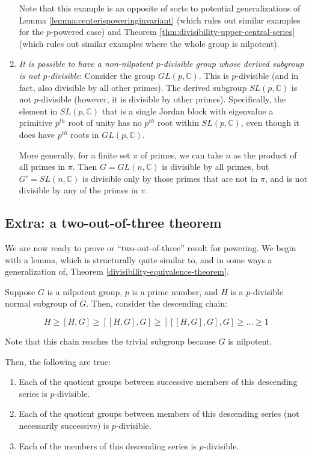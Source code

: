 \documentclass{ucetd}
\begin{document}
\begin{enumerate}
  Note that this example is an opposite of sorts to potential
  generalizations of Lemma \ref{lemma:centerispoweringinvariant} (which
  rules out similar examples for the $p$-powered case) and Theorem
  \ref{thm:divisibility-upper-central-series} (which rules out similar
  examples where the whole group is nilpotent).

\item {\em It is possible to have a non-nilpotent $p$-divisible group
  whose derived subgroup is not $p$-divisible}: Consider the group
  $GL(p,\mathbb{C})$. This is $p$-divisible (and in fact, also
  divisible by all other primes). The derived subgroup
  $SL(p,\mathbb{C})$ is not $p$-divisible (however, it is divisible by
  other primes). Specifically, the element in $SL(p,\mathbb{C})$ that
  is a single Jordan block with eigenvalue a primitive $p^{th}$ root
  of unity has no $p^{th}$ root within $SL(p,\mathbb{C})$, even though
  it does have $p^{th}$ roots in $GL(p,\mathbb{C})$.

  More generally, for a finite set $\pi$ of primes, we can take $n$ as
  the product of all primes in $\pi$. Then $G = GL(n,\mathbb{C})$ is
  divisible by all primes, but $G' = SL(n,\mathbb{C})$ is divisible
  only by those primes that are not in $\pi$, and is not divisible by
  any of the primes in $\pi$.
\end{enumerate}

\subsection{Extra: a two-out-of-three theorem}

We are now ready to prove or ``two-out-of-three'' result for
powering. We begin with a lemma, which is structurally quite similar
to, and in some ways a generalization of, Theorem
\ref{divisibility-equivalence-theorem}.

\begin{lemma}\label{lemma:lcs-subgroup-divisibility}
  Suppose $G$ is a nilpotent group, $p$ is a prime number, and $H$ is
  a $p$-divisible normal subgroup of $G$. Then, consider the
  descending chain:

  $$H \ge [H,G] \ge [[H,G],G] \ge [[[H,G],G],G] \ge \dots \ge 1$$

  Note that this chain reaches the trivial subgroup because $G$ is nilpotent.

  Then, the following are true:

  \begin{enumerate}
  \item Each of the quotient groups between successive members of this descending series is $p$-divisible.
  \item Each of the quotient groups between members of this descending
    series (not necessarily successive) is $p$-divisible.
  \item Each of the members of this descending series is $p$-divisible.
  \end{enumerate}
\end{lemma}
\end{document}
